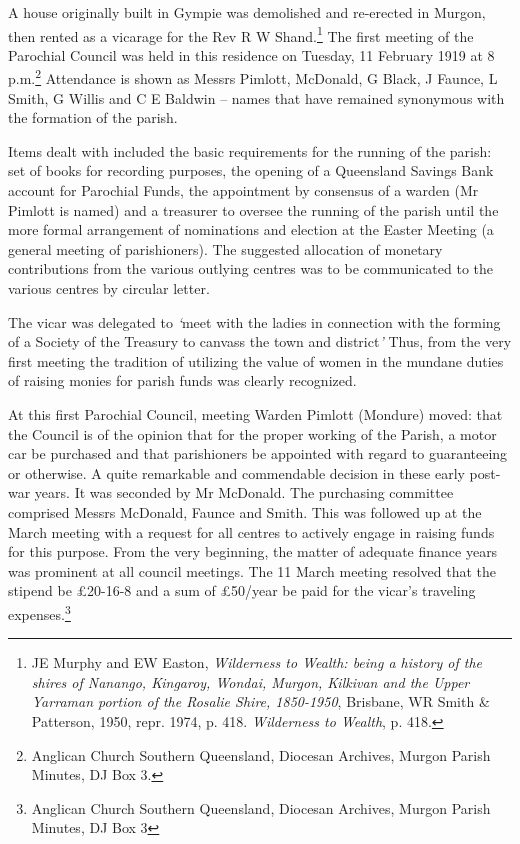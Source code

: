 A house originally built in Gympie was demolished and re-erected in Murgon, then rented as a vicarage for the Rev R W Shand.\footnote{JE Murphy and EW Easton, \emph{Wilderness to Wealth: being a history of the shires of Nanango, Kingaroy, Wondai, Murgon, Kilkivan and the Upper Yarraman portion of the Rosalie Shire, 1850-1950}, Brisbane, WR Smith \& Patterson, 1950, repr. 1974, p. 418. \emph{Wilderness to Wealth}, p. 418.} The first meeting of the Parochial Council was held in this residence on Tuesday, 11 February 1919 at 8 p.m.\footnote{Anglican Church Southern Queensland, Diocesan Archives, Murgon Parish Minutes, DJ Box 3.} Attendance is shown as Messrs Pimlott, McDonald, G Black, J Faunce, L Smith, G Willis and C E Baldwin -- names that have remained synonymous with the formation of the parish.

Items dealt with included the basic requirements for the running of the parish: set of books for recording purposes, the opening of a Queensland Savings Bank account for Parochial Funds, the appointment by consensus of a warden (Mr Pimlott is named) and a treasurer to oversee the running of the parish until the more formal arrangement of nominations and election at the Easter Meeting (a general meeting of parishioners). The suggested allocation of monetary contributions from the various outlying centres was to be communicated to the various centres by circular letter.

The vicar was delegated to \emph{`}meet with the ladies in connection with the forming of a Society of the Treasury to canvass the town and district\emph{'} Thus, from the very first meeting the tradition of utilizing the value of women in the mundane duties of raising monies for parish funds was clearly recognized.

At this first Parochial Council, meeting Warden Pimlott (Mondure) moved: that the Council is of the opinion that for the proper working of the Parish, a motor car be purchased and that parishioners be appointed with regard to guaranteeing or otherwise. A quite remarkable and commendable decision in these early post-war years. It was seconded by Mr McDonald. The purchasing committee comprised Messrs McDonald, Faunce and Smith. This was followed up at the March meeting with a request for all centres to actively engage in raising funds for this purpose. From the very beginning, the matter of adequate finance years was prominent at all council meetings. The 11 March meeting resolved that the stipend be £20-16-8 and a sum of £50/year be paid for the vicar's traveling expenses.\footnote{Anglican Church Southern Queensland, Diocesan Archives, Murgon Parish Minutes, DJ Box 3}

